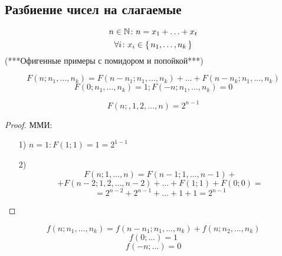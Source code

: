 \subsection{Разбиение чисел на слагаемые}
\[
n \in \mathbb{N} \colon n = x_1 + \ldots + x_t
\]
\[
\forall i \colon x_i \in \set{n_1, \ldots, n_k}
\]
(***Офигенные примеры с помидором и попойкой***)
\begin{theorem}
\label{solve:popoika}
\[
F(n; n_1, \ldots, n_k) = F(n - n_1; n_1, \ldots, n_k) + \ldots + F(n - n_k; n_1, \ldots, n_k)
\]
\[
F(0; n_1, \ldots, n_k) = 1; F(-n; n_1, \ldots, n_k) = 0
\]
\end{theorem}
\begin{consequence}
\[
F(n;, 1, 2, \ldots, n) = 2^{n - 1}
\]
\end{consequence}
\begin{proof}
 ММИ:
 \begin{itemize}
   \item [1) ] $n = 1 \colon F(1; 1) = 1 = 2^{1 - 1}$
   \item [2) ] \[
   F(n; 1, \ldots, n) = F(n - 1; 1, \ldots, n - 1) + 
   \]
   \[
    + F(n - 2; 1, 2, \ldots, n - 2) + \ldots + F(1; 1) + F(0; 0) = 
   \]
   \[
    = 2^{n - 2} + 2^{n - 1} + \ldots + 1 + 1 = 2^{n - 1}
   \]
 \end{itemize}
\end{proof} 
\begin{theorem}
\label{solve:tomato}
\[
f(n; n_1, \ldots, n_k) = f(n - n_1; n_1, \ldots, n_k) + f(n; n_2, \ldots, n_k)
\]
\[
f(0; \ldots) = 1
\]
\[
f(-n; \ldots) = 0
\]
\end{theorem}
